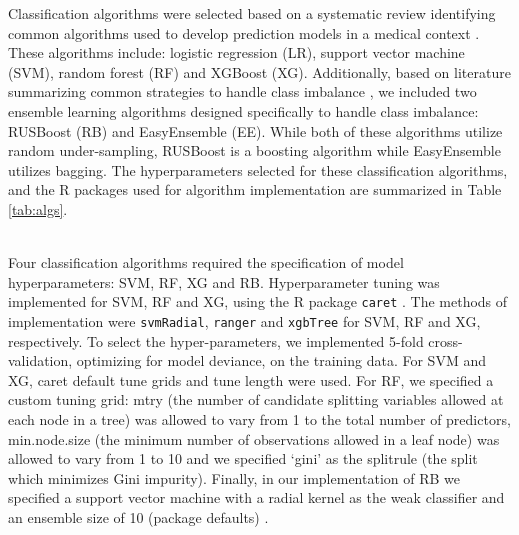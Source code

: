 \documentclass[AMA,STIX1COL,]{WileyNJD-v2}
\begin{document}
\hfill\break
Classification algorithms were selected based on a systematic review
identifying common algorithms used to develop prediction models in a
medical context \citep{constanza}. These algorithms include: logistic
regression (LR), support vector machine (SVM), random forest (RF) and
XGBoost (XG). Additionally, based on literature summarizing common
strategies to handle class imbalance \citep{yu, summary_m, lp, kaur}, we
included two ensemble learning algorithms designed specifically to
handle class imbalance: RUSBoost (RB) and EasyEnsemble (EE). While both
of these algorithms utilize random under-sampling, RUSBoost is a
boosting algorithm while EasyEnsemble utilizes bagging. The
hyperparameters selected for these classification algorithms, and the R
packages used for algorithm implementation are summarized in Table
\ref{tab:algs}.\\
\strut \\
Four classification algorithms required the specification of model
hyperparameters: SVM, RF, XG and RB. Hyperparameter tuning was
implemented for SVM, RF and XG, using the R package \texttt{caret}
\citep{caret}. The methods of implementation were \texttt{svmRadial},
\texttt{ranger} and \texttt{xgbTree} for SVM, RF and XG, respectively.
To select the hyper-parameters, we implemented 5-fold cross-validation,
optimizing for model deviance, on the training data. For SVM and XG,
caret default tune grids and tune length were used. For RF, we specified
a custom tuning grid: mtry (the number of candidate splitting variables
allowed at each node in a tree) was allowed to vary from 1 to the total
number of predictors, min.node.size (the minimum number of observations
allowed in a leaf node) was allowed to vary from 1 to 10 and we
specified `gini' as the splitrule (the split which minimizes Gini
impurity). Finally, in our implementation of RB we specified a support
vector machine with a radial kernel as the weak classifier and an
ensemble size of 10 (package defaults) \citep{ebmc}.\\
\end{document}
